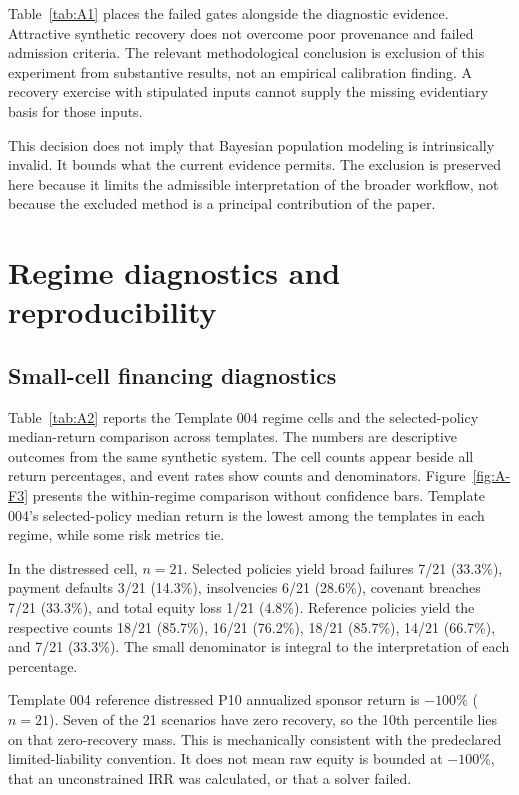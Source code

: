 \documentclass[11pt,a4paper]{article}
\newcommand{\exhibit}[1]{}
\begin{document}
Table~\ref{tab:A1} places the failed gates alongside the diagnostic evidence. Attractive synthetic recovery does not overcome poor provenance and failed admission criteria. The relevant methodological conclusion is exclusion of this experiment from substantive results, not an empirical calibration finding. A recovery exercise with stipulated inputs cannot supply the missing evidentiary basis for those inputs.

This decision does not imply that Bayesian population modeling is intrinsically invalid. It bounds what the current evidence permits. The exclusion is preserved here because it limits the admissible interpretation of the broader workflow, not because the excluded method is a principal contribution of the paper.
\exhibit{A1}

\clearpage
\section{Regime diagnostics and reproducibility}\label{sec:repro}
\subsection{Small-cell financing diagnostics}
Table~\ref{tab:A2} reports the Template 004 regime cells and the selected-policy median-return comparison across templates. The numbers are descriptive outcomes from the same synthetic system. The cell counts appear beside all return percentages, and event rates show counts and denominators. Figure~\ref{fig:A-F3} presents the within-regime comparison without confidence bars. Template 004's selected-policy median return is the lowest among the templates in each regime, while some risk metrics tie.

In the distressed cell, $n=21$. Selected policies yield broad failures 7/21 (33.3\%), payment defaults 3/21 (14.3\%), insolvencies 6/21 (28.6\%), covenant breaches 7/21 (33.3\%), and total equity loss 1/21 (4.8\%). Reference policies yield the respective counts 18/21 (85.7\%), 16/21 (76.2\%), 18/21 (85.7\%), 14/21 (66.7\%), and 7/21 (33.3\%). The small denominator is integral to the interpretation of each percentage.

Template 004 reference distressed P10 annualized sponsor return is $-100\%$ ($n=21$). Seven of the 21 scenarios have zero recovery, so the 10th percentile lies on that zero-recovery mass. This is mechanically consistent with the predeclared limited-liability convention. It does not mean raw equity is bounded at $-100\%$, that an unconstrained IRR was calculated, or that a solver failed.
\exhibit{A2}
\end{document}
